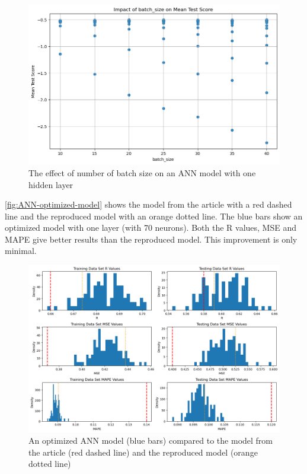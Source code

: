 \documentclass{article}
\begin{document}
\begin{figure}
	\centering
	\includegraphics[width=\linewidth]{figures/ANN_impact_batchsize_1layer.png}
	\caption{The effect of number of batch size on an ANN model with one hidden layer}
	\label{fig:ANN-impact-batchsize-1layer}
\end{figure}

\autoref{fig:ANN-optimized-model} shows the model from the article with a red dashed line and the reproduced model with an orange dotted line. The blue bars show an optimized model with one layer (with 70 neurons). Both the R values, MSE and MAPE give better results than the reproduced model. This improvement is only minimal.


\begin{figure}
	\centering
	\includegraphics[width=\linewidth]{figures/ANN_optimized_model.png}
	\caption{An optimized ANN model (blue bars) compared to the model from the article (red dashed line) and the reproduced model (orange dotted line)}
	\label{fig:ANN-optimized-model}
\end{figure}
\end{document}
